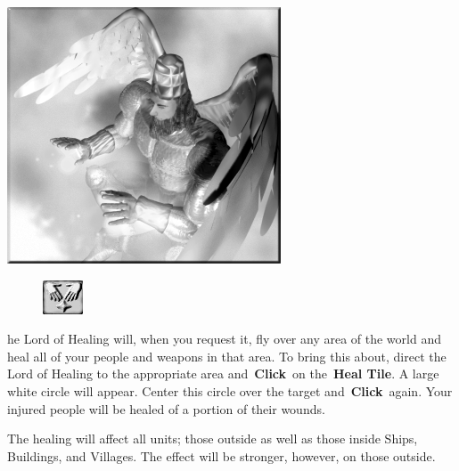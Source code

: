 
\begin{center}
	\includegraphics[width=.9\linewidth]{Ahealinglord}
\end{center}

\begin{figure}
	\vspace{-20pt}
	\begin{center}
		\includegraphics[width=.1\textwidth]{Theal}
	\end{center}
	\vspace{-20pt}
\end{figure}

he Lord of Healing will, when you request it, fly over any area of the world and heal all of your people and weapons in that area. To bring this about, direct the Lord of Healing to the appropriate area and \textbf{Click} on the \textbf{Heal Tile}. A large white circle will appear. Center this circle over the target and \textbf{Click} again. Your injured people will be healed of a portion of their wounds.

The healing will affect all units; those outside as well as those inside Ships, Buildings, and Villages. The effect will be stronger, however, on those outside.

